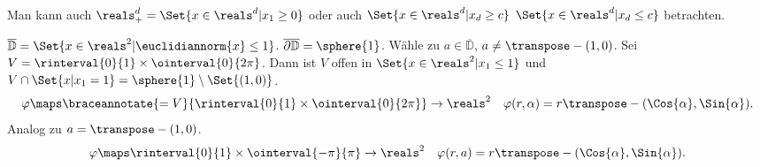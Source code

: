 \begin{bemerkung*}
  Man kann auch \( \reals_{+}^d=\Set{x\in \reals^d|x_1\geq 0} \) oder auch \( \Set{x\in \reals^d|x_d\geq c} \) \bzw \( \Set{x\in \reals^d|x_d\leq c} \) betrachten.
\end{bemerkung*}
\begin{beispiel*}
  \( \overline{\mathbb{D}}=\Set{x\in \reals^2| \euclidiannorm{x}\leq 1} \). \( \overline{\partial \mathbb{D}}=\sphere{1} \). Wähle zu \( a\in \overline{\mathbb{D}} \), \( a\neq \transpose-{(1,0)} \). Sei \( V=\rinterval{0}{1}\times \ointerval{0}{2\pi} \). Dann ist \( V \) offen in \( \Set{x\in \reals^2|x_1\leq 1} \) und \( V\cap \Set{x|x_1=1}=\sphere{1}\setminus \Set{(1,0)} \).
  \begin{equation*}
    \varphi\maps \braceannotate{=V}{\rinterval{0}{1}\times \ointerval{0}{2\pi}}\to \reals^2\quad \varphi(r,\alpha)=r\transpose-{(\Cos{\alpha},\Sin{\alpha})}.
  \end{equation*}
  Analog zu \( a=\transpose-{(1,0)} \).
  \begin{gather*}
    \varphi\maps \rinterval{0}{1}\times \ointerval{-\pi}{\pi}\to \reals^2\quad \varphi(r,a)=r\transpose-{(\Cos{\alpha},\Sin{\alpha})}.
  \end{gather*}
\end{beispiel*}
